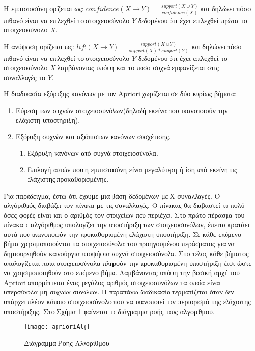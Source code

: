 \documentclass[12pt,a4paper,final]{article}
\begin{document}
Η εμπιστοσύνη ορίζεται ως:
$confidence (X \to Y) = \frac{support (X \cup Y)}{confidence (X)}$ και δηλώνει πόσο πιθανό είναι να επιλεχθεί το στοιχειοσύνολο $Y$ δεδομένου ότι έχει επιλεχθεί πρώτα το στοιχειοσύνολο $X$.\bigskip

Η ανύψωση ορίζεται ως:
$lift(X \to Y) = \frac{support(X \cup Y)}{support(X) * support(Y)}  $ και δηλώνει  πόσο πιθανό είναι να επιλεχθεί το στοιχειοσύνολο $Y$  δεδομένου ότι έχει επιλεχθεί το στοιχειοσύνολο $X$ λαμβάνοντας υπόψη και το πόσο συχνά εμφανίζεται στις συναλλαγές το  $Y$. \bigskip

Η διαδικασία εξόρυξης κανόνων με τον \foreignlanguage{english}{Apriori} χωρίζεται σε δύο κυρίως βήματα: 
\begin{enumerate}
	\item Εύρεση των συχνών στοιχειοσυνόλων(δηλαδή εκείνα που ικανοποιούν την ελάχιστη υποστήριξη).
	\item Εξόρυξη συχνών και αξιόπιστων κανόνων συσχέτισης.
	\begin{enumerate}
	\item Εξόρυξη κανόνων από συχνά στοιχειοσύνολα.
	\item Επιλογή αυτών που η εμπιστοσύνη είναι μεγαλύτερη ή ίση από εκείνη τις ελάχιστης προκαθορισμένης.
	\end{enumerate}
\end{enumerate}

Για παράδειγμα, έστω ότι έχουμε μια βάση δεδομένων με Χ συναλλαγές. Ο αλγόριθμός διαβάζει τον πίνακα με τις συναλλαγές. Ο πίνακας θα διαβαστεί το πολύ όσες φορές είναι και ο αριθμός τον στοιχείων που περιέχει. Στο πρώτο πέρασμα του πίνακα ο αλγόριθμος υπολογίζει την υποστήριξη των στοιχειοσυνόλων, έπειτα κρατάει αυτά που ικανοποιούν την προκαθορισμένη ελάχιστη υποστήριξη. Σε κάθε επόμενο βήμα χρησιμοποιούνται τα στοιχειοσύνολα του προηγουμένου περάσματος για να δημιουργηθούν καινούργια υποψήφια συχνά στοιχειοσύνολα. Στο τέλος κάθε βήματος υπολογίζεται ποια στοιχειοσύνολα πληρούν την προκαθορισμένη υποστήριξη  έτσι ώστε να χρησιμοποιηθούν στο επόμενο βήμα. Λαμβάνοντας υπόψη την βασική αρχή του \foreignlanguage{english}{Apriori} απορρίπτεται ένας μεγάλος αριθμός στοιχειοσυνόλων τα  οποία είναι υπερσύνολα μη συχνών συνόλων. Η παραπάνω διαδικασία τερματίζεται όταν δεν υπάρχει πλέον κάποιο στοιχειοσύνολο που να ικανοποιεί τον περιορισμό της ελάχιστης υποστήριξης. Στο Σχήμα \ref{fig:apriori} φαίνεται το διάγραμμα ροής τους αλγορίθμου. \\

\graphicspath{{./arules/}}
\begin{figure}[h]
         \centering
         \texttt{[image: aprioriAlg]}
         \caption{Διάγραμμα Ροής Αλγορίθμου}
         \label{fig:apriori}
\end{figure}
     
\end{document}
